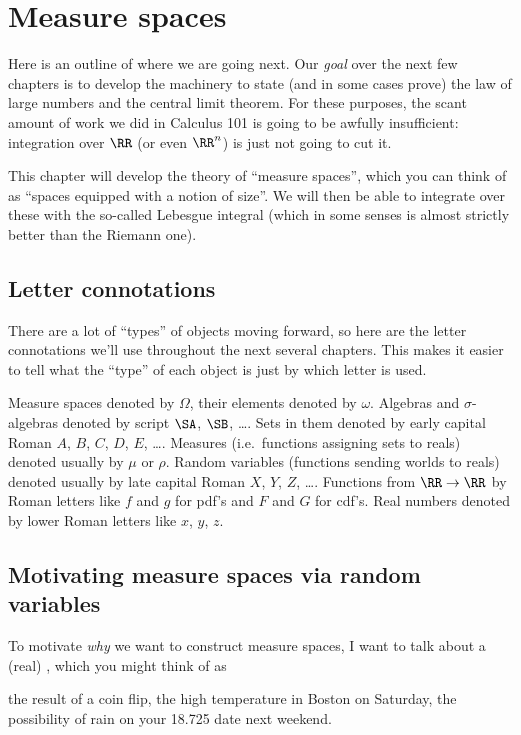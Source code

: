 \chapter{Measure spaces}
\label{ch:measure_space}
Here is an outline of where we are going next.
Our \emph{goal} over the next few chapters
is to develop the machinery to state (and in some cases prove)
the law of large numbers and the central limit theorem.
For these purposes, the scant amount of work we did in Calculus 101
is going to be awfully insufficient:
integration over $\RR$ (or even $\RR^n$) is just not going to cut it.

This chapter will develop the theory of ``measure spaces'',
which you can think of as ``spaces equipped with a notion of size''.
We will then be able to integrate over these
with the so-called Lebesgue integral
(which in some senses is almost strictly better than the Riemann one).

\section{Letter connotations}
There are a lot of ``types'' of objects moving forward,
so here are the letter connotations we'll use
throughout the next several chapters.
This makes it easier to tell what the ``type'' of each object
is just by which letter is used.
\begin{itemize}
	\ii Measure spaces denoted by $\Omega$,
	their elements denoted by $\omega$.
	\ii Algebras and $\sigma$-algebras denoted by script $\SA$, $\SB$, \dots.
	Sets in them denoted by early capital Roman $A$, $B$, $C$, $D$, $E$, \dots.
	\ii Measures (i.e.\ functions assigning sets to reals)
	denoted usually by $\mu$ or $\rho$.
	\ii Random variables (functions sending worlds to reals)
	denoted usually by late capital Roman $X$, $Y$, $Z$, \dots.
	\ii Functions from $\RR \to \RR$
	by Roman letters like $f$ and $g$ for pdf's
	and $F$ and $G$ for cdf's.
	\ii Real numbers denoted by lower Roman letters like $x$, $y$, $z$.
\end{itemize}


\section{Motivating measure spaces via random variables}
To motivate \emph{why} we want to construct measure spaces,
I want to talk about a (real) ,
which you might think of as
\begin{itemize}
	\ii the result of a coin flip,
	\ii the high temperature in Boston on Saturday,
	\ii the possibility of rain on your 18.725 date next weekend.
\end{itemize}

